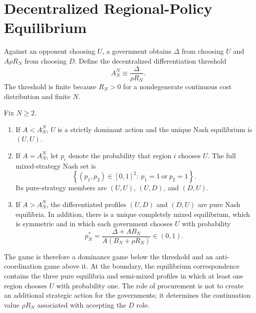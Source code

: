 \section{Decentralized Regional-Policy Equilibrium}
\label{sec:equilibrium}

Against an opponent choosing $U$, a government obtains $\Delta$ from choosing $U$ and $A\rho R_N$ from choosing $D$. Define the decentralized differentiation threshold
\begin{equation}
A_N^N\equiv \frac{\Delta}{\rho R_N}.
\label{eq:AN-main}
\end{equation}
The threshold is finite because $R_N>0$ for a nondegenerate continuous cost distribution and finite $N$.

\begin{proposition}
\label{prop:nash}
Fix $N\ge2$.
\begin{enumerate}[label=(\roman*)]
\item If $A<A_N^N$, $U$ is a strictly dominant action and the unique Nash equilibrium is $(U,U)$.
\item If $A=A_N^N$, let $p_i$ denote the probability that region $i$ chooses $U$. The full mixed-strategy Nash set is
\begin{equation}
\left\{(p_1,p_2)\in[0,1]^2:\ p_1=1\ \text{or}\ p_2=1\right\}.
\label{eq:boundary-nash}
\end{equation}
Its pure-strategy members are $(U,U)$, $(U,D)$, and $(D,U)$.
\item If $A>A_N^N$, the differentiated profiles $(U,D)$ and $(D,U)$ are pure Nash equilibria. In addition, there is a unique completely mixed equilibrium, which is symmetric and in which each government chooses $U$ with probability
\begin{equation}
p_N^*=\frac{\Delta+A B_N}{A(B_N+\rho R_N)}\in(0,1).
\label{eq:mixed}
\end{equation}
\end{enumerate}
\end{proposition}

The game is therefore a dominance game below the threshold and an anti-coordination game above it. At the boundary, the equilibrium correspondence contains the three pure equilibria and semi-mixed profiles in which at least one region chooses $U$ with probability one. The role of procurement is not to create an additional strategic action for the governments; it determines the continuation value $\rho R_N$ associated with accepting the $D$ role.

